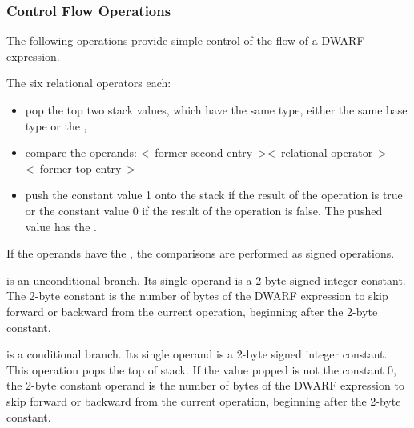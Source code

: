 \subsubsection{Control Flow Operations}
\label{chap:controlflowoperations}
The 
following operations provide simple control of the flow of a DWARF expression.
\begin{enumerate}[1. ]
\itembfnl{\DWOPleTARG, \DWOPgeTARG, \DWOPeqTARG, \DWOPltTARG, \DWOPgtTARG, \DWOPneTARG}
The six relational operators each:
\begin{itemize}
\item pop the top two stack values, which have the same type,
either the same base type or the \generictype, 

\item compare the operands:
\linebreak
\textless~former second entry~\textgreater  \textless~relational operator~\textgreater \textless~former top entry~\textgreater

\item push the constant value 1 onto the stack 
if the result of the operation is true or the
constant value 0 if the result of the operation is false.
The pushed value has the \generictype.
\end{itemize}

If the operands have the \generictype, the comparisons  
are performed as signed operations.

\itembfnl{\DWOPskipTARG}
\DWOPskipNAME{} is an unconditional branch. Its single operand
is a 2-byte signed integer constant. The 2-byte constant is
the number of bytes of the DWARF expression to skip forward
or backward from the current operation, beginning after the
2-byte constant.

\itembfnl{\DWOPbraTARG}
\DWOPbraNAME{} is a conditional branch. Its single operand is a
2-byte signed integer constant.  This operation pops the
top of stack. If the value popped is not the constant 0,
the 2-byte constant operand is the number of bytes of the
DWARF expression to skip forward or backward from the current
operation, beginning after the 2-byte constant.


\end{enumerate}
